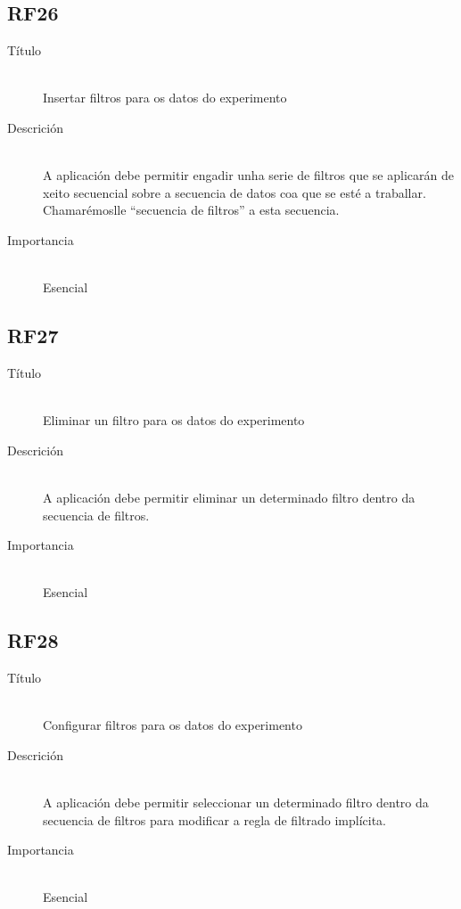 \subsection*{RF26}
\begin{description}
\item[Título] \hfill \\
Insertar filtros para os datos do experimento
\item[Descrición] \hfill \\
A aplicación debe permitir engadir unha serie de filtros que se aplicarán de xeito secuencial sobre a secuencia de datos coa que se esté a traballar. Chamarémoslle ``secuencia de filtros'' a esta secuencia.
\item[Importancia] \hfill \\
Esencial
\end{description}

\subsection*{RF27}
\begin{description}
\item[Título] \hfill \\
Eliminar un filtro para os datos do experimento
\item[Descrición] \hfill \\
A aplicación debe permitir eliminar un determinado filtro dentro da secuencia de filtros.
\item[Importancia] \hfill \\
Esencial
\end{description}

\subsection*{RF28}
\begin{description}
\item[Título] \hfill \\
Configurar filtros para os datos do experimento
\item[Descrición] \hfill \\
A aplicación debe permitir seleccionar un determinado filtro dentro da secuencia de filtros para modificar a regla de filtrado implícita.
\item[Importancia] \hfill \\
Esencial
\end{description}


